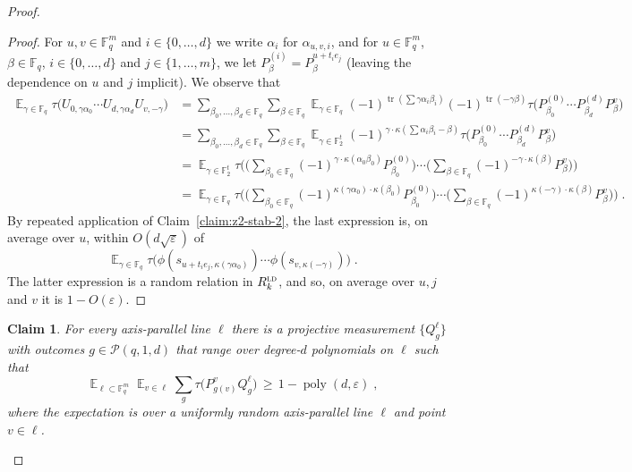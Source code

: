 \documentclass[11pt]{article}
\newtheorem{claim}[theorem]{Claim}
\theoremstyle{definition}
\DeclareMathOperator*{\Expectation}{\mathbb{E}}
\newcommand{\Es}[1]{\Expectation_{#1}}
\newcommand{\F}{\ensuremath{\mathbb{F}}}
\newcommand{\ld}{\textsc{ld}}
\DeclareMathOperator{\poly}{poly}
\newcommand{\eps}{\varepsilon}
\DeclareMathOperator{\tr}{tr}
\renewcommand{\cal}[1]{\mathcal{#1}}
\begin{document}
\begin{proof}
\begin{proof}
For $u,v\in \F_q^m$ and $i\in\{0,\ldots,d\}$ we write $\alpha_i$ for $\alpha_{u,v,i}$, and for $u\in\F_q^m$, $\beta\in\F_q$, $i\in\{0,\ldots,d\}$ and $j\in\{1,\ldots,m\}$, we let $P^{(i)}_\beta = P^{u+t_ie_j}_\beta$ (leaving the dependence on $u$ and $j$ implicit).
We observe that 
\begin{align*}
\Es{\gamma\in\F_q} \tau\big( U_{0,\gamma\alpha_{0}}\cdots U_{d,\gamma\alpha_{d}} U_{v,-\gamma} \big)
&=  \sum_{\beta_0,\ldots,\beta_d\in\F_q}\sum_{\beta\in\F_q} \Es{\gamma\in\F_q} (-1)^{\tr(\sum \gamma \alpha_i\beta_i)} (-1)^{\tr(-\gamma\beta)} \tau\big( P^{(0)}_{\beta_0} \cdots P^{(d)}_{\beta_d} P^v_\beta \big)\\
&= \sum_{\beta_0,\ldots,\beta_d\in\F_q}\sum_{\beta\in\F_q}\Es{\gamma\in\F_2^t} (-1)^{\gamma\cdot \kappa(\sum \alpha_i\beta_i-\beta)} \tau\big( P^{(0)}_{\beta_0} \cdots P^{(d)}_{\beta_d} P^v_\beta \big)\\
&=\Es{\gamma\in\F_2^t}  \tau\Big( \Big(\sum_{\beta_0\in \F_q} (-1)^{\gamma\cdot \kappa(\alpha_0\beta_0)} P^{(0)}_{\beta_0} \Big)\cdots\Big(\sum_{\beta\in \F_q} (-1)^{-\gamma\cdot \kappa(\beta)} P^{v}_{\beta} \Big)\Big)\\
&=\Es{\gamma\in\F_q}  \tau\Big( \Big(\sum_{\beta_0\in \F_q} (-1)^{\kappa( \gamma \alpha_0)\cdot\kappa(\beta_0)} P^{(0)}_{\beta_0} \Big)\cdots\Big(\sum_{\beta\in \F_q} (-1)^{\kappa(-\gamma)\cdot \kappa(\beta)} P^{v}_{\beta} \Big)\Big)\;.
\end{align*}
By repeated application of Claim~\ref{claim:z2-stab-2}, the last expression is, on average over $u$, within $O(d\sqrt{\eps})$ of 
\[ \Es{\gamma\in\F_q}  \tau\big( \phi(s_{u+t_ie_j,\kappa(\gamma \alpha_0)})\cdots \phi(s_{v,\kappa(-\gamma)}) \big)\;.\]
The latter expression is a random relation in $R^\ld_k$, and so, on average over $u,j$ and $v$ it is $1-O(\eps)$.
\end{proof}


\begin{claim}\label{claim:z2-stab-4}
For every axis-parallel line $\ell$ there is a projective measurement $\{Q^\ell_g\}$ with outcomes $g \in \cal{P}(q,1,d)$ that range over degree-$d$ polynomials on $\ell$ such that
\[ \Es{\ell\subset \F_q^m} \Es{v\in \ell} \sum_g \tau\big( P^v_{g(v)} Q^\ell_g\big) \,\geq\, 1-\poly(d,\eps)\;, \]
where the expectation is over a uniformly random axis-parallel line $\ell$ and point $v\in \ell$. 
\end{claim}


\end{proof}
\end{document}
